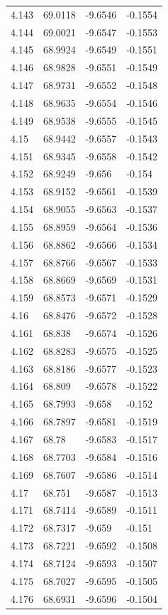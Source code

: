 \begin{tabular}{llll}
4.143 & 69.0118 & -9.6546 & -0.1554 \\
4.144 & 69.0021 & -9.6547 & -0.1553 \\
4.145 & 68.9924 & -9.6549 & -0.1551 \\
4.146 & 68.9828 & -9.6551 & -0.1549 \\
4.147 & 68.9731 & -9.6552 & -0.1548 \\
4.148 & 68.9635 & -9.6554 & -0.1546 \\
4.149 & 68.9538 & -9.6555 & -0.1545 \\
4.15 & 68.9442 & -9.6557 & -0.1543 \\
4.151 & 68.9345 & -9.6558 & -0.1542 \\
4.152 & 68.9249 & -9.656 & -0.154 \\
4.153 & 68.9152 & -9.6561 & -0.1539 \\
4.154 & 68.9055 & -9.6563 & -0.1537 \\
4.155 & 68.8959 & -9.6564 & -0.1536 \\
4.156 & 68.8862 & -9.6566 & -0.1534 \\
4.157 & 68.8766 & -9.6567 & -0.1533 \\
4.158 & 68.8669 & -9.6569 & -0.1531 \\
4.159 & 68.8573 & -9.6571 & -0.1529 \\
4.16 & 68.8476 & -9.6572 & -0.1528 \\
4.161 & 68.838 & -9.6574 & -0.1526 \\
4.162 & 68.8283 & -9.6575 & -0.1525 \\
4.163 & 68.8186 & -9.6577 & -0.1523 \\
4.164 & 68.809 & -9.6578 & -0.1522 \\
4.165 & 68.7993 & -9.658 & -0.152 \\
4.166 & 68.7897 & -9.6581 & -0.1519 \\
4.167 & 68.78 & -9.6583 & -0.1517 \\
4.168 & 68.7703 & -9.6584 & -0.1516 \\
4.169 & 68.7607 & -9.6586 & -0.1514 \\
4.17 & 68.751 & -9.6587 & -0.1513 \\
4.171 & 68.7414 & -9.6589 & -0.1511 \\
4.172 & 68.7317 & -9.659 & -0.151 \\
4.173 & 68.7221 & -9.6592 & -0.1508 \\
4.174 & 68.7124 & -9.6593 & -0.1507 \\
4.175 & 68.7027 & -9.6595 & -0.1505 \\
4.176 & 68.6931 & -9.6596 & -0.1504 \\

\end{tabular}
